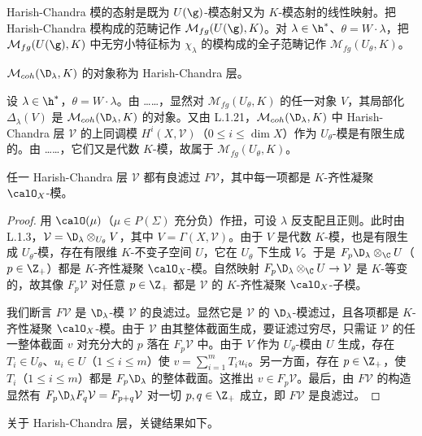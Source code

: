 Harish-Chandra 模的态射是既为 $U(\g)$-模态射又为 $K$-模态射的线性映射。把 Harish-Chandra 模构成的范畴记作 $\mathcal{M}_{fg}(U(\g),K)$。对 $\lambda\in\h^*$、$\theta=W\cdot\lambda$，把 $\mathcal{M}_{fg}(U(\g),K)$ 中无穷小特征标为 $\chi_\lambda$ 的模构成的全子范畴记作 $\mathcal{M}_{fg}(U_\theta,K)$。

$\mathcal{M}_{coh}(\D_\lambda,K)$ 的对象称为 Harish-Chandra 层。

设 $\lambda\in\h^*$，$\theta=W\cdot\lambda$。由 ……，显然对 $\mathcal{M}_{fg}(U_\theta,K)$ 的任一对象 $V$，其局部化 $\Delta_\lambda(V)$ 是 $\mathcal{M}_{coh}(\D_\lambda,K)$ 的对象。又由 L.1.21，$\mathcal{M}_{coh}(\D_\lambda,K)$ 中 Harish-Chandra 层 $\mathcal{V}$ 的上同调模 $H^i(X,\mathcal{V})$（$0\le i\le\dim X$）作为 $U_\theta$-模是有限生成的。由 ……，它们又是代数 $K$-模，故属于 $\mathcal{M}_{fg}(U_\theta,K)$。

\begin{lemma}\label{lem:04.4.3.1}
任一 Harish-Chandra 层 $\mathcal{V}$ 都有良滤过 $F\mathcal{V}$，其中每一项都是 $K$-齐性凝聚 $\calO_X$-模。
\end{lemma}

\begin{proof}
用 $\calO(\mu)$（$\mu\in P(\Sigma)$ 充分负）作扭，可设 $\lambda$ 反支配且正则。此时由 L.1.3，$\mathcal{V}=\D_\lambda\otimes_{U_\theta}V$，其中 $V=\Gamma(X,\mathcal{V})$。由于 $V$ 是代数 $K$-模，也是有限生成 $U_\theta$-模，存在有限维 $K$-不变子空间 $U$，它在 $U_\theta$ 下生成 $V$。于是 $F_p\D_\lambda\otimes_\C U$（$p\in\Z_+$）都是 $K$-齐性凝聚 $\calO_X$-模。自然映射 $F_p\D_\lambda\otimes_\C U\to\mathcal{V}$ 是 $K$-等变的，故其像 $F_p\mathcal{V}$ 对任意 $p\in\Z_+$ 都是 $\mathcal{V}$ 的 $K$-齐性凝聚 $\calO_X$-子模。

我们断言 $F\mathcal{V}$ 是 $\D_\lambda$-模 $\mathcal{V}$ 的良滤过。显然它是 $\mathcal{V}$ 的 $\D_\lambda$-模滤过，且各项都是 $K$-齐性凝聚 $\calO_X$-模。由于 $\mathcal{V}$ 由其整体截面生成，要证滤过穷尽，只需证 $\mathcal{V}$ 的任一整体截面 $v$ 对充分大的 $p$ 落在 $F_p\mathcal{V}$ 中。由于 $V$ 作为 $U_\theta$-模由 $U$ 生成，存在 $T_i\in U_\theta$、$u_i\in U$（$1\le i\le m$）使 $v=\sum_{i=1}^m T_iu_i$。另一方面，存在 $p\in\Z_+$，使 $T_i$（$1\le i\le m$）都是 $F_p\D_\lambda$ 的整体截面。这推出 $v\in F_p\mathcal{V}$。最后，由 $F\mathcal{V}$ 的构造显然有 $F_p\D_\lambda F_q\mathcal{V}=F_{p+q}\mathcal{V}$ 对一切 $p,q\in\Z_+$ 成立，即 $F\mathcal{V}$ 是良滤过。
\end{proof}

关于 Harish-Chandra 层，关键结果如下。

